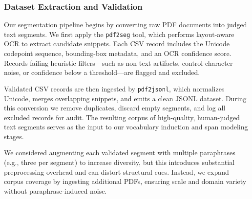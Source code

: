 \subsubsection{Dataset Extraction and Validation}
\label{sec:dataset-extraction}

Our segmentation pipeline begins by converting raw PDF documents into judged text segments.  We first apply the \texttt{pdf2seg} tool, which performs layout-aware OCR to extract candidate snippets.  Each CSV record includes the Unicode codepoint sequence, bounding-box metadata, and an OCR confidence score.  Records failing heuristic filters—such as non-text artifacts, control-character noise, or confidence below a threshold—are flagged and excluded.

Validated CSV records are then ingested by \texttt{pdf2jsonl}, which normalizes Unicode, merges overlapping snippets, and emits a clean JSONL dataset.  During this conversion we remove duplicates, discard empty segments, and log all excluded records for audit.  The resulting corpus of high-quality, human-judged text segments serves as the input to our vocabulary induction and span modeling stages.

We considered augmenting each validated segment with multiple paraphrases (e.g., three per segment) to increase diversity, but this introduces substantial preprocessing overhead and can distort structural cues.  Instead, we expand corpus coverage by ingesting additional PDFs, ensuring scale and domain variety without paraphrase‐induced noise.